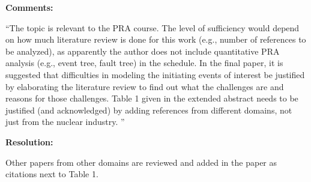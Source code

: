 \documentclass[12pt]{article}
\begin{document}
\textbf{Comments:}
\begin{center}
    \begin{varwidth}{0.8\textwidth}

``The topic is relevant to the PRA course. The level of sufficiency would depend on how much literature review is done for this work (e.g., number of references to be analyzed), as apparently the author does not include quantitative PRA analysis (e.g., event tree, fault tree) in the schedule. In the final paper, it is suggested that difficulties in modeling the initiating events of interest be justified by elaborating the literature review to find out what the challenges are and reasons for those challenges. Table 1 given in the extended abstract needs to be justified (and acknowledged) by adding references from different domains, not just from the nuclear industry. ''

    \end{varwidth}
\end{center}

\noindent \textbf{Resolution:}

Other papers from other domains are reviewed and added in the paper
as citations next to Table 1.


\pagebreak 





\end{document}
